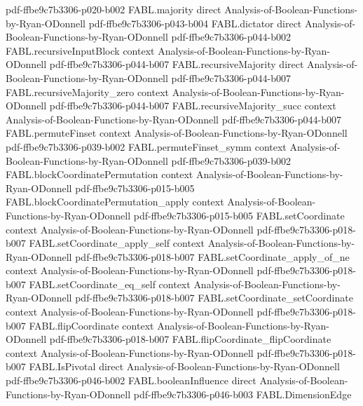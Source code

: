 \begin{theorem}
  {pdf-ffbe9c7b3306-p020-b002}
\proofstep
  {FABL.majority}
  {direct}
  {Analysis-of-Boolean-Functions-by-Ryan-ODonnell}
  {pdf-ffbe9c7b3306-p043-b004}
\proofstep
  {FABL.dictator}
  {direct}
  {Analysis-of-Boolean-Functions-by-Ryan-ODonnell}
  {pdf-ffbe9c7b3306-p044-b002}
\proofstep
  {FABL.recursiveInputBlock}
  {context}
  {Analysis-of-Boolean-Functions-by-Ryan-ODonnell}
  {pdf-ffbe9c7b3306-p044-b007}
\proofstep
  {FABL.recursiveMajority}
  {direct}
  {Analysis-of-Boolean-Functions-by-Ryan-ODonnell}
  {pdf-ffbe9c7b3306-p044-b007}
\proofstep
  {FABL.recursiveMajority_zero}
  {context}
  {Analysis-of-Boolean-Functions-by-Ryan-ODonnell}
  {pdf-ffbe9c7b3306-p044-b007}
\proofstep
  {FABL.recursiveMajority_succ}
  {context}
  {Analysis-of-Boolean-Functions-by-Ryan-ODonnell}
  {pdf-ffbe9c7b3306-p044-b007}
\proofstep
  {FABL.permuteFinset}
  {context}
  {Analysis-of-Boolean-Functions-by-Ryan-ODonnell}
  {pdf-ffbe9c7b3306-p039-b002}
\proofstep
  {FABL.permuteFinset_symm}
  {context}
  {Analysis-of-Boolean-Functions-by-Ryan-ODonnell}
  {pdf-ffbe9c7b3306-p039-b002}
\proofstep
  {FABL.blockCoordinatePermutation}
  {context}
  {Analysis-of-Boolean-Functions-by-Ryan-ODonnell}
  {pdf-ffbe9c7b3306-p015-b005}
\proofstep
  {FABL.blockCoordinatePermutation_apply}
  {context}
  {Analysis-of-Boolean-Functions-by-Ryan-ODonnell}
  {pdf-ffbe9c7b3306-p015-b005}
\proofstep
  {FABL.setCoordinate}
  {context}
  {Analysis-of-Boolean-Functions-by-Ryan-ODonnell}
  {pdf-ffbe9c7b3306-p018-b007}
\proofstep
  {FABL.setCoordinate_apply_self}
  {context}
  {Analysis-of-Boolean-Functions-by-Ryan-ODonnell}
  {pdf-ffbe9c7b3306-p018-b007}
\proofstep
  {FABL.setCoordinate_apply_of_ne}
  {context}
  {Analysis-of-Boolean-Functions-by-Ryan-ODonnell}
  {pdf-ffbe9c7b3306-p018-b007}
\proofstep
  {FABL.setCoordinate_eq_self}
  {context}
  {Analysis-of-Boolean-Functions-by-Ryan-ODonnell}
  {pdf-ffbe9c7b3306-p018-b007}
\proofstep
  {FABL.setCoordinate_setCoordinate}
  {context}
  {Analysis-of-Boolean-Functions-by-Ryan-ODonnell}
  {pdf-ffbe9c7b3306-p018-b007}
\proofstep
  {FABL.flipCoordinate}
  {context}
  {Analysis-of-Boolean-Functions-by-Ryan-ODonnell}
  {pdf-ffbe9c7b3306-p018-b007}
\proofstep
  {FABL.flipCoordinate_flipCoordinate}
  {context}
  {Analysis-of-Boolean-Functions-by-Ryan-ODonnell}
  {pdf-ffbe9c7b3306-p018-b007}
\proofstep
  {FABL.IsPivotal}
  {direct}
  {Analysis-of-Boolean-Functions-by-Ryan-ODonnell}
  {pdf-ffbe9c7b3306-p046-b002}
\proofstep
  {FABL.booleanInfluence}
  {direct}
  {Analysis-of-Boolean-Functions-by-Ryan-ODonnell}
  {pdf-ffbe9c7b3306-p046-b003}
\proofstep
  {FABL.DimensionEdge}

\end{theorem}
